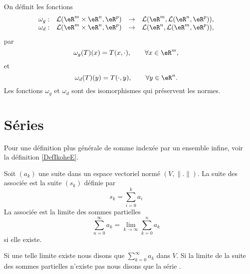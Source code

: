 \begin{proposition}\label{isom_isom}
  On définit les fonctions
  \begin{equation}
    \begin{array}{rccc}
      \omega_g: & \mathcal{L}(\eR^{m}\times\eR^{n}, \eR^p)&\to &\mathcal{L}(\eR^{m}, \mathcal{L}(\eR^{n}, \eR^p)),\\
      \omega_d: & \mathcal{L}(\eR^{m}\times\eR^{n}, \eR^p)&\to &\mathcal{L}(\eR^{n}, \mathcal{L}(\eR^{m}, \eR^p)),
    \end{array}
  \end{equation}
par
\[
\omega_g(T)(x)=T(x,\cdot), \qquad \forall x\in\eR^m,
\]
et
\[
\omega_d(T)(y)=T(\cdot, y), \qquad \forall y\in\eR^n.
\]
Les fonctions $\omega_g$ et $\omega_d$ sont des isomorphismes qui préservent les normes.
\end{proposition}

\section{Séries}
\label{SECooYCQBooSZNXhd}

Pour une définition plus générale de somme indexée par un ensemble infine, voir la définition \ref{DefIkoheE}.
\begin{definition}\label{DefGFHAaOL}
    Soit \( (a_k)\) une suite dans un espace vectoriel normé \( (V,\| . \| )\). La suite des  associée est la suite \( (s_k)\) définie par
    \begin{equation}
        s_k=\sum_{i=0}^ka_i
    \end{equation}
    La  associée est la limite des sommes partielles
    \begin{equation}
        \sum_{n=0}^{\infty}a_k=\lim_{k\to \infty} \sum_{k=0}^na_k
    \end{equation}
    si elle existe.

    Si une telle limite existe nous disons que \( \sum_{k=0}^{\infty}a_k\)  dans \( V\). Si la limite de la suite des sommes partielles n'existe pas nous disons que la série .
\end{definition}

